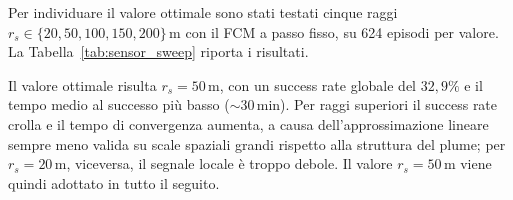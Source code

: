 Per individuare il valore ottimale sono stati testati cinque raggi
$r_s \in \{20,\allowbreak 50,\allowbreak 100,\allowbreak 150,\allowbreak 200\}\,\text{m}$
con il FCM a passo fisso, su 624 episodi per valore. La Tabella~\ref{tab:sensor_sweep}
riporta i risultati.

\begin{table}[H]
\centering
\renewcommand{\arraystretch}{1.3}
\caption{Sweep sul raggio di campionamento $r_s$ (FCM a passo fisso, 624 episodi per
         valore). In verde il valore ottimale.}
\label{tab:sensor_sweep}
\end{table}

Il valore ottimale risulta $r_s = 50\,\text{m}$, con un success rate globale del
$32{,}9\%$ e il tempo medio al successo pi\`u basso ($\sim$30\,min). Per raggi
superiori il success rate crolla e il tempo di convergenza aumenta, a causa
dell'approssimazione lineare sempre meno valida su scale spaziali grandi rispetto alla
struttura del plume; per $r_s = 20\,\text{m}$, viceversa, il segnale locale \`e troppo
debole. Il valore $r_s = 50\,\text{m}$ viene quindi adottato in tutto il seguito.

